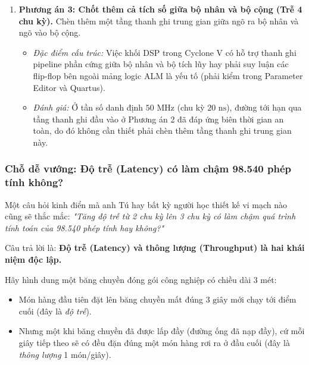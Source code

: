 \begin{enumerate}[leftmargin=1.5em, itemsep=3pt]
    \item \textbf{Phương án 3: Chốt thêm cả tích số giữa bộ nhân và bộ cộng (Trễ 4 chu kỳ).}
    Chèn thêm một tầng thanh ghi trung gian giữa ngõ ra bộ nhân và ngõ vào bộ cộng.
    \begin{itemize}[leftmargin=1.2em, itemsep=2pt]
        \item \emph{Đặc điểm cấu trúc:} Việc khối DSP trong Cyclone V có hỗ trợ thanh ghi pipeline phần cứng giữa bộ nhân và bộ tích lũy hay phải suy luận các flip-flop bên ngoài mảng logic ALM là yếu tố (phải kiểm trong Parameter Editor và Quartus).
        \item \emph{Đánh giá:} Ở tần số danh định $50\text{ MHz}$ (chu kỳ $20\text{ ns}$), đường tới hạn qua tầng thanh ghi đầu vào ở Phương án 2 đã đáp ứng biên thời gian an toàn, do đó không cần thiết phải chèn thêm tầng thanh ghi trung gian này.
    \end{itemize}
\end{enumerate}

\subsubsection*{Chỗ dễ vướng: Độ trễ (Latency) có làm chậm 98.540 phép tính không?}
Một câu hỏi kinh điển mà anh Tú hay bất kỳ người học thiết kế vi mạch nào cũng sẽ thắc mắc: \emph{"Tăng độ trễ từ 2 chu kỳ lên 3 chu kỳ có làm chậm quá trình tính toán của 98.540 phép tính hay không?"}

Câu trả lời là: \textbf{Độ trễ (Latency) và thông lượng (Throughput) là hai khái niệm độc lập.}

Hãy hình dung một băng chuyền đóng gói công nghiệp có chiều dài 3 mét:
\begin{itemize}[leftmargin=1.5em, itemsep=2pt]
    \item Món hàng đầu tiên đặt lên băng chuyền mất đúng $3\text{ giây}$ mới chạy tới điểm cuối (đây là \emph{độ trễ}).
    \item Nhưng một khi băng chuyền đã được lấp đầy (đường ống đã nạp đầy), cứ mỗi giây tiếp theo sẽ có đều đặn đúng một món hàng rơi ra ở đầu cuối (đây là \emph{thông lượng} 1 món/giây).
\end{itemize}

